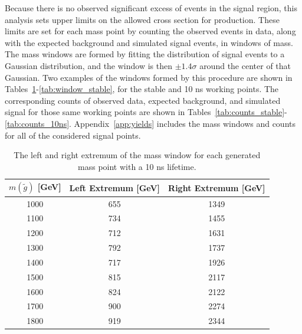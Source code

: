Because there is no observed significant excess of events in the signal region, this analysis sets upper limits on the allowed cross section for \rhadron production.
These limits are set for each mass point by counting the observed events in data, along with the expected background and simulated signal events, in windows of mass.
The mass windows are formed by fitting the distribution of signal events to a Gaussian distribution, and the window is then $\pm 1.4\sigma$ around the center of that Gaussian.
Two examples of the windows formed by this procedure are shown in Tables~\ref{tab:window_10ns}-\ref{tab:window_stable}, for the stable and 10 ns working points.
The corresponding counts of observed data, expected background, and simulated signal for those same working points are shown in Tables~\ref{tab:counts_stable}-\ref{tab:counts_10ns}.
Appendix~\ref{app:yields} includes the mass windows and counts for all of the considered signal points.

\begin{table}[!htbp]
  \begin{center}
    \begin{tabular}{ccc}
        \hline
        $m(\tilde{g})$ [GeV]  & Left Extremum [GeV] & Right Extremum [GeV] \\
        \hline
        1000    & 655 & 1349 \\
        1100    & 734 & 1455 \\
        1200    & 712 & 1631 \\
        1300    & 792 & 1737 \\
        1400    & 717 & 1926 \\
        1500    & 815 & 2117 \\
        1600    & 824 & 2122 \\
        1700    & 900 & 2274 \\
        1800    & 919 & 2344 \\
        \hline
    \end{tabular}
  \end{center}
  \caption{The left and right extremum of the mass window for each generated mass point with a 10 ns lifetime.}
  \label{tab:window_10ns}
\end{table}

